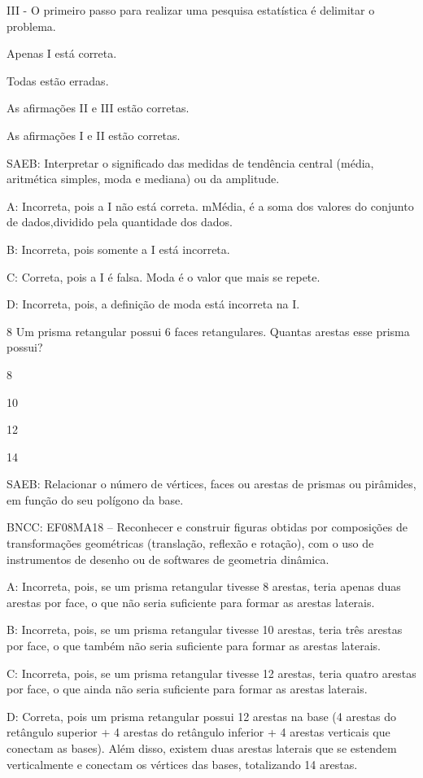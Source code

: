 {III - O primeiro passo para realizar uma pesquisa estatística é
delimitar o problema.
\item Apenas I está correta.
\item Todas estão erradas.
\item As afirmações II e III estão corretas.
\item As afirmações I e II estão corretas.

SAEB: Interpretar o significado das medidas de tendência central (média,
aritmética simples, moda e mediana) ou da amplitude.

A: Incorreta, pois a I não está correta. mMédia, é a soma dos valores do
conjunto de dados,dividido pela quantidade dos dados.

B: Incorreta, pois somente a I está incorreta.

C: Correta, pois a I é falsa. Moda é o valor que mais se repete.

D: Incorreta, pois, a definição de moda está incorreta na I.

\num{8} Um prisma retangular possui 6 faces retangulares. Quantas arestas
esse prisma possui?
\item 8
\item 10
\item 12
\item 14

SAEB: Relacionar o número de vértices, faces ou arestas de prismas ou
pirâmides, em função do seu polígono da base.

BNCC: EF08MA18 -- Reconhecer e construir figuras obtidas por composições
de transformações geométricas (translação, reflexão e rotação), com o
uso de instrumentos de desenho ou de softwares de geometria dinâmica.

A: Incorreta, pois, se um prisma retangular tivesse 8 arestas, teria
apenas duas arestas por face, o que não seria suficiente para formar as
arestas laterais.

B: Incorreta, pois, se um prisma retangular tivesse 10 arestas, teria
três arestas por face, o que também não seria suficiente para formar as
arestas laterais.

C: Incorreta, pois, se um prisma retangular tivesse 12 arestas, teria
quatro arestas por face, o que ainda não seria suficiente para formar as
arestas laterais.

D: Correta, pois um prisma retangular possui 12 arestas na base (4
arestas do retângulo superior + 4 arestas do retângulo inferior + 4
arestas verticais que conectam as bases). Além disso, existem duas
arestas laterais que se estendem verticalmente e conectam os vértices
das bases, totalizando 14 arestas.

}
